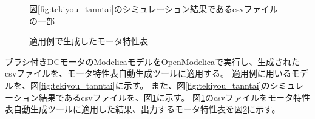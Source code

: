 \begin{figure}[t]
	\centering
	\fbox{
    }
	\caption{図\ref{fig:tekiyou_tanntai}のシミュレーション結果であるcsvファイルの一部}
	\label{fig:tekiyou_csv}
\end{figure}

\begin{figure}[t]
	\centering
	\caption{適用例で生成したモータ特性表}
	\label{fig:tekiyou_mortoku}
\end{figure}

ブラシ付きDCモータのModelicaモデルをOpenModelicaで実行し、生成されたcsvファイルを、モータ特性表自動生成ツールに適用する。
適用例に用いるモデルを、図\ref{fig:tekiyou_tanntai}に示す。
また、図\ref{fig:tekiyou_tanntai}のシミュレーション結果であるcsvファイルを、図\ref{fig:tekiyou_csv}に示す。
図\ref{fig:tekiyou_csv}のcsvファイルをモータ特性表自動生成ツールに適用した結果、出力するモータ特性表を図\ref{fig:tekiyou_mortoku}に示す。

